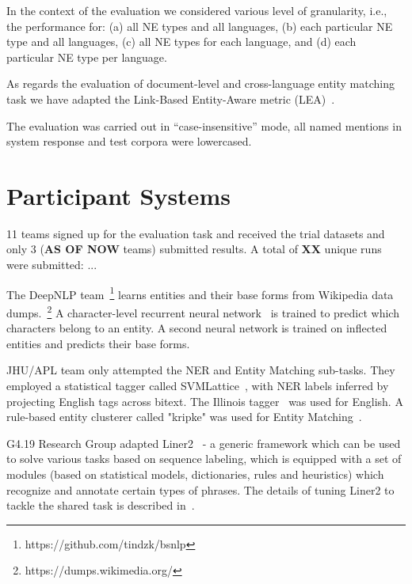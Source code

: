 \documentclass[11pt]{article}
\begin{document}
In the context of the evaluation we considered various level of granularity, i.e., the performance for: 
(a) all NE types and all languages, (b) each particular NE type and all languages, (c) all NE types for each language,
and (d) each particular NE type per language. 

As regards the evaluation of document-level and cross-language entity matching task we have adapted the 
Link-Based Entity-Aware metric (LEA)~\cite{DBLP:conf-acl-Moosavi016}.

The evaluation was carried out in ``case-insensitive'' mode, all named mentions in system response and test corpora were 
lowercased.


\section{Participant Systems}
\label{sec:participants}
 
11 teams signed up for the evaluation task and received the trial datasets and 
only 3 (\textbf{AS OF NOW} teams) submitted results. A total of \textbf{XX} 
unique runs were submitted: ...

The {\sc DeepNLP} team~\footnote{https://github.com/tindzk/bsnlp} learns entities and their base forms from 
Wikipedia data dumps.~\footnote{https://dumps.wikimedia.org/} A character-level recurrent neural network~\cite{DBLP:conf/aaai/KimJSR16} 
is trained to predict which characters belong to an entity. A second neural network is trained on inflected entities and predicts their base forms.

JHU/APL team only attempted the NER and Entity Matching sub-tasks. They employed a statistical tagger called 
SVMLattice~\cite{Mayfield:2003:LTU:956863.956921}, with NER labels inferred by projecting English tags across bitext. 
The Illinois tagger~\cite{Ratinov:2009:DCM:1596374.1596399} was used for English. A rule-based entity clusterer 
called "kripke" was used for Entity Matching~\cite{DBLP:conf/tac/McNameeMFL13}.

{\sc G4.19 Research Group} adapted Liner2~\cite{series/sci/MarcinczukKJ13} - a generic framework 
which can be used to solve various tasks based on sequence labeling, which is equipped
with a set of modules (based on statistical models, dictionaries, rules and heuristics) 
which recognize and annotate certain types of phrases. The details of tuning Liner2 to
tackle the shared task is described in~\cite{marcinczuk:2017}.
\end{document}
